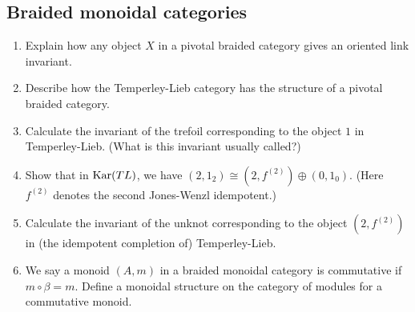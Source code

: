 \documentclass[12pt]{amsart}
\begin{document}
\subsection{Braided monoidal categories}
\begin{enumerate}
\item Explain how any object $X$ in a pivotal braided category gives an oriented link invariant.
\item Describe how the Temperley-Lieb category has the structure of a pivotal braided category.
\item Calculate the invariant of the trefoil corresponding to the object $1$ in Temperley-Lieb. (What is this invariant usually called?)
\item Show that in $\operatorname{Kar}(TL)$, we have $(2,1_2) \cong (2,f^{(2)}) \oplus (0, 1_0)$. (Here $f^{(2)}$ denotes the second Jones-Wenzl idempotent.)
\item Calculate the invariant of the unknot corresponding to the object $(2,f^{(2)})$ in (the idempotent completion of) Temperley-Lieb.
\item We say a monoid $(A, m)$ in a braided monoidal category is commutative if $m \circ \beta = m$. Define a monoidal structure on the category of modules for a commutative monoid.
\end{enumerate}


\end{document}
